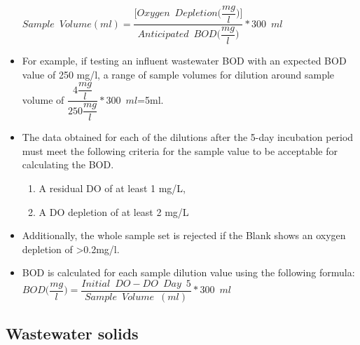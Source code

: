\begin{itemize}
\textbf{$Sample \enspace Volume (ml) = \dfrac{\Big[Oxygen \enspace Depletion \Big(\dfrac{mg}{l}\Big)\Big]}{Anticipated \enspace BOD \Big(\dfrac{mg}{l}\Big)}*300 \enspace ml$}\\

\item For example, if testing an influent wastewater BOD with an expected BOD value of 250 mg/l, a range of sample volumes for dilution around sample volume of $\dfrac{4\dfrac{mg}{l}}{250 \dfrac{mg}{l}}*300 \enspace ml$=5ml.\\
\vspace{0.4cm}
\item The data obtained for each of the dilutions after the 5-day incubation period must meet the following criteria for the sample value to be acceptable for calculating the BOD.\\
\vspace{0.4cm}

\begin{enumerate}[1.]
\setlength\itemsep{1em}

\item A residual DO of at least 1 mg/L,
\item A DO depletion of at least 2 mg/L
\end{enumerate}
\vspace{0.4cm}
\item Additionally, the whole sample set is rejected if the Blank shows an oxygen depletion of >0.2mg/l.\\
\vspace{0.4cm}
\item BOD is calculated for each sample dilution value using the following formula:\\
\vspace{0.4cm}
\textbf{$BOD \Big(\dfrac{mg}{l}\Big) = \dfrac{Initial \enspace DO - DO \enspace Day \enspace 5}{Sample \enspace Volume \enspace (ml)}*300 \enspace ml$}\\



\end{itemize}
\vspace{0.4cm}
\subsection{Wastewater solids}

